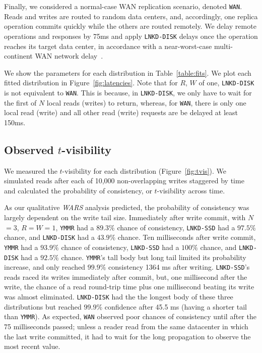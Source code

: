 \documentclass{vldb}
\newcommand{\subsectionskip}{-0em}
\begin{document}
Finally, we considered a normal-case WAN replication scenario, denoted
\texttt{WAN}.  Reads and writes are routed to random data centers,
and, accordingly, one replica operation commits quickly while the
others are routed remotely.  We delay remote operations and responses
by 75ms and apply \texttt{LNKD-DISK} delays once the operation reaches
its target data center, in accordance with a near-worst-case
multi-continent WAN network delay~\cite{dean-keynote}.

We show the parameters for each distribution in
Table~\ref{table:fits}. We plot each fitted distribution in
Figure~\ref{fig:latencies}.  Note that for $R$, $W$ of one,
\texttt{LNKD-DISK} is not equivalent to \texttt{WAN}.  This is
because, in \texttt{LNKD-DISK}, we only have to wait for the first of
$N$ local reads (writes) to return, whereas, for \texttt{WAN}, there
is only one local read (write) and all other read (write) requests
are be delayed at least 150ms.

\vspace{\subsectionskip}\subsection{Observed {\large$t$}-visibility}

We measured the $t$-visibility for each distribution
(Figure~\ref{fig:tvis}).  We simulated reads
after each of 10,000 non-overlapping writes staggered by time
and calculated the probability of consistency, or 
$t$-visibility across time.

As our qualitative \textit{WARS} analysis predicted, the probability
of consistency was largely dependent on the write tail size.
Immediately after write commit, with $N$$=$$3$, $R$$=$$W$$=$$1$,
\texttt{YMMR} had a $89.3\%$ chance of consistency, \texttt{LNKD-SSD}
had a $97.5\%$ chance, and \texttt{LNKD-DISK} had a $43.9\%$ chance.
Ten milliseconds after write commit, \texttt{YMMR} had a $93.9\%$
chance of consistency, \texttt{LNKD-SSD} had a $100\%$ chance, and
\texttt{LNKD-DISK} had a $92.5\%$ chance.  \texttt{YMMR}'s tall body
but long tail limited its probability increase, and only reached
$99.9\%$ consistency 1364 ms after writing.  \texttt{LNKD-SSD}'s reads
raced its writes immediately after commit, but, one millisecond after
the write, the chance of a read round-trip time plus one millisecond
beating its write was almost eliminated.  \texttt{LNKD-DISK} had the
the longest body of these three distributions but reached $99.9\%$
confidence after 45.5 ms (having a shorter tail than \texttt{YMMR}).  As
expected, \texttt{WAN} observed poor chances of consistency until
after the 75 milliseconds passed; unless a reader read from the same
datacenter in which the last write committed, it had to wait for the
long propagation to observe the most recent value.
\end{document}
